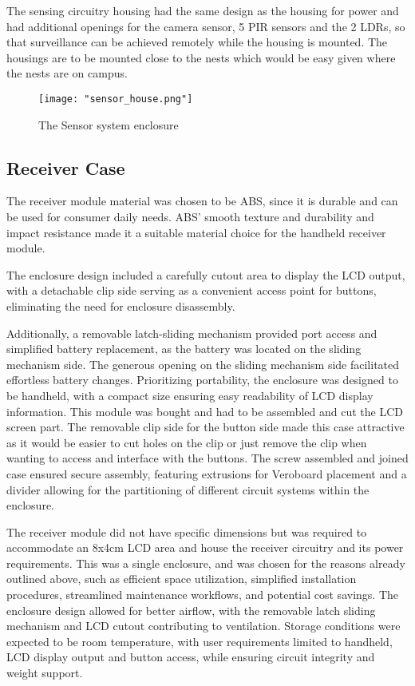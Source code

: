 \documentclass[class=report,11pt,crop=false]{standalone}
\begin{document}
 
The sensing circuitry housing had the same design as the housing for power and had additional openings for the camera sensor, 5 PIR sensors and the 2 LDRs, so that surveillance can be achieved remotely while the housing is mounted. The housings are to be mounted close to the nests which would be easy given where the nests are on campus. 

\begin{figure}[H]
    \centering
    \texttt{[image: "sensor\_house.png"]}
    \caption{The Sensor system enclosure}
    \label{fig:enter-label4}
\end{figure}

 
\subsection{Receiver Case}
The receiver module material was chosen to be ABS, since it is durable and can be used for consumer daily needs. ABS’ smooth texture and durability and impact resistance made it a suitable material choice for the handheld receiver module.
\newline

The enclosure design included a carefully cutout area to display the LCD output, with a detachable clip side serving as a convenient access point for buttons, eliminating the need for enclosure disassembly. 
\newline

Additionally, a removable latch-sliding mechanism provided port access and simplified battery replacement, as the battery was located on the sliding mechanism side. The generous opening on the sliding mechanism side facilitated effortless battery changes. Prioritizing portability, the enclosure was designed to be handheld, with a compact size ensuring easy readability of LCD display information. This module was bought and had to be assembled and cut the LCD screen part. The removable clip side for the button side made this case attractive as it would be easier to cut holes on the clip or just remove the clip when wanting to access and interface with the buttons. The screw assembled and joined case ensured secure assembly, featuring extrusions for Veroboard placement and a divider allowing for the partitioning of different circuit systems within the enclosure.
\newline

The receiver module did not have specific dimensions but was required to accommodate an 8x4cm LCD area and house the receiver circuitry and its power requirements. This was a single enclosure, and was chosen for the reasons already outlined above, such as efficient space utilization, simplified installation procedures, streamlined maintenance workflows, and potential cost savings. The enclosure design allowed for better airflow, with the removable latch sliding mechanism and LCD cutout contributing to ventilation. Storage conditions were expected to be room temperature, with user requirements limited to handheld, LCD display output and button access, while ensuring circuit integrity and weight support.
\end{document}
